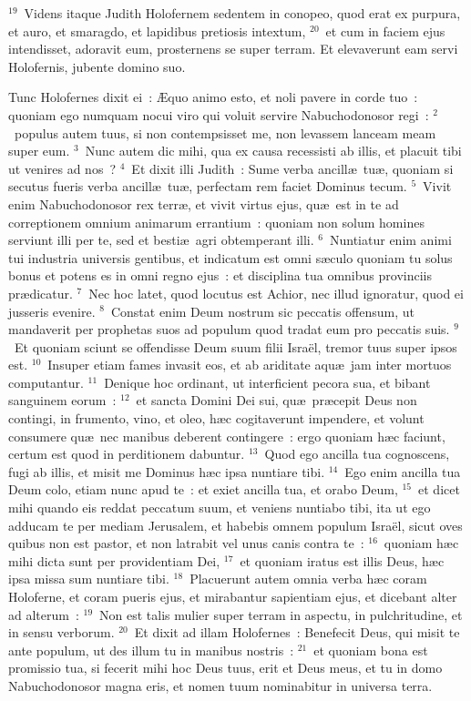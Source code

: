 ${}^{19}$~Videns itaque Judith Holofernem sedentem in conopeo, quod erat ex purpura, et auro, et smaragdo, et lapidibus pretiosis intextum,
${}^{20}$~et cum in faciem ejus intendisset, adoravit eum, prosternens se super terram. Et elevaverunt eam servi Holofernis, jubente domino suo.

\lettrine[lines=3,image=true,loversize=0.05,lraise=-0.03]{T}{}unc Holofernes dixit ei~: \AE quo animo esto, et noli pavere in corde tuo~: quoniam ego numquam nocui viro qui voluit servire Nabuchodonosor regi~:
${}^{2}$~populus autem tuus, si non contempsisset me, non levassem lanceam meam super eum.
${}^{3}$~Nunc autem dic mihi, qua ex causa recessisti ab illis, et placuit tibi ut venires ad nos~?
${}^{4}$~Et dixit illi Judith~: Sume verba ancill\ae\ tu\ae , quoniam si secutus fueris verba ancill\ae\ tu\ae , perfectam rem faciet Dominus tecum.
${}^{5}$~Vivit enim Nabuchodonosor rex terr\ae , et vivit virtus ejus, qu\ae\ est in te ad correptionem omnium animarum errantium~: quoniam non solum homines serviunt illi per te, sed et besti\ae\ agri obtemperant illi.
${}^{6}$~Nuntiatur enim animi tui industria universis gentibus, et indicatum est omni s\ae culo quoniam tu solus bonus et potens es in omni regno ejus~: et disciplina tua omnibus provinciis pr\ae dicatur.
${}^{7}$~Nec hoc latet, quod locutus est Achior, nec illud ignoratur, quod ei jusseris evenire.
${}^{8}$~Constat enim Deum nostrum sic peccatis offensum, ut mandaverit per prophetas suos ad populum quod tradat eum pro peccatis suis.
${}^{9}$~Et quoniam sciunt se offendisse Deum suum filii Isra\"el, tremor tuus super ipsos est.
${}^{10}$~Insuper etiam fames invasit eos, et ab ariditate aqu\ae\ jam inter mortuos computantur.
${}^{11}$~Denique hoc ordinant, ut interficient pecora sua, et bibant sanguinem eorum~:
${}^{12}$~et sancta Domini Dei sui, qu\ae\ pr\ae cepit Deus non contingi, in frumento, vino, et oleo, h\ae c cogitaverunt impendere, et volunt consumere qu\ae\ nec manibus deberent contingere~: ergo quoniam h\ae c faciunt, certum est quod in perditionem dabuntur.
${}^{13}$~Quod ego ancilla tua cognoscens, fugi ab illis, et misit me Dominus h\ae c ipsa nuntiare tibi.
${}^{14}$~Ego enim ancilla tua Deum colo, etiam nunc apud te~: et exiet ancilla tua, et orabo Deum,
${}^{15}$~et dicet mihi quando eis reddat peccatum suum, et veniens nuntiabo tibi, ita ut ego adducam te per mediam Jerusalem, et habebis omnem populum Isra\"el, sicut oves quibus non est pastor, et non latrabit vel unus canis contra te~:
${}^{16}$~quoniam h\ae c mihi dicta sunt per providentiam Dei,
${}^{17}$~et quoniam iratus est illis Deus, h\ae c ipsa missa sum nuntiare tibi.
${}^{18}$~Placuerunt autem omnia verba h\ae c coram Holoferne, et coram pueris ejus, et mirabantur sapientiam ejus, et dicebant alter ad alterum~:
${}^{19}$~Non est talis mulier super terram in aspectu, in pulchritudine, et in sensu verborum.
${}^{20}$~Et dixit ad illam Holofernes~: Benefecit Deus, qui misit te ante populum, ut des illum tu in manibus nostris~:
${}^{21}$~et quoniam bona est promissio tua, si fecerit mihi hoc Deus tuus, erit et Deus meus, et tu in domo Nabuchodonosor magna eris, et nomen tuum nominabitur in universa terra.

